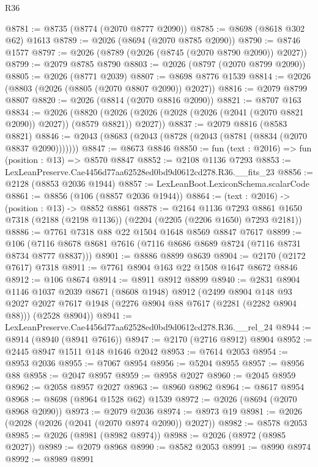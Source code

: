 \begin{lexlean}{R36}
\begin{coremodule}
@8781 := @8735 (@8774 (@2070 @8777 @2090))
@8785 := @8698 (@8618 @302 @62) @1613
@8789 := @2026 (@8694 (@2070 @8785 @2090))
@8790 := @8746 @1577
@8797 := @2026 (@8789 (@2026 (@8745 (@2070 @8790 @2090)) @2027))
@8799 := @2079 @8785 @8790
@8803 := @2026 (@8797 (@2070 @8799 @2090))
@8805 := @2026 (@8771 @2039)
@8807 := @8698 @8776 @1539
@8814 := @2026 (@8803 (@2026 (@8805 (@2070 @8807 @2090)) @2027))
@8816 := @2079 @8799 @8807
@8820 := @2026 (@8814 (@2070 @8816 @2090))
@8821 := @8707 @163
@8834 := @2026
    (@8820 (@2026 (@2026 (@2028 (@2026 (@2041 (@2070 @8821 @2090)) @2027)) (@8579 @8821)) @2027))
@8837 := @2079 @8816 (@8583 @8821)
@8846 := @2043 (@8683 (@2043 (@8728 (@2043 (@8781 (@8834 (@2070 @8837 @2090)))))))
@8847 := @8673 @8846
@8850 := fun (text : @2016) => fun (position : @13) => @8570 @8847
@8852 := @2108 @1136 @7293
@8853 := LexLeanPreserve.Cae4456d77aa62528ed0bd9d0612cd278.R36.__fits_23
@8856 := @2128 (@8853 @2036 @1944)
@8857 := LexLeanBoot.LexiconSchema.scalarCode
@8861 := @8856 (@106 (@8857 @2036 @1944))
@8864 := (text : @2016) -> (position : @13) -> @8852 @8861
@8878 := @2164
    @1136
    @7293
    @8861
    @1650
    @7318
    (@2188 (@2198 @1136))
    (@2204 (@2205 (@2206 @1650) @7293 @2181))
@8886 := @7761 @7318 @88 @22 @1504 @1648 @8569 @8847 @7617
@8899 := @106 (@7116 @8678 @8681 @7616 (@7116 @8686 @8689 @8724 (@7116 @8731 @8734 @8777 @8837)))
@8901 := @8886 @8899 @8639
@8904 := @2170 (@2172 @7617) @7318
@8911 := @7761 @8904 @163 @22 @1508 @1647 @8672 @8846
@8912 := @106 @8674
@8914 := @8911 @8912 @8899
@8940 := @2831
    @8904
    @1146
    @1037
    @2039
    @8671
    (@8608 @1948)
    @8912
    (@2499
      @8904
      @148
      @93
      @2027
      @2027
      @7617
      @1948
      (@2276 @8904 @88 @7617 (@2281 (@2282 @8904 @88)))
      (@2528 @8904))
@8941 := LexLeanPreserve.Cae4456d77aa62528ed0bd9d0612cd278.R36.__rel_24
@8944 := @8914 (@8940 (@8941 @7616))
@8947 := @2170 (@2716 @8912) @8904
@8952 := @2445 @8947 @1511 @148 @1646 @2042
@8953 := @7614 @2053
@8954 := @8953 @2036
@8955 := @7067 @8954
@8956 := @5204 @8955
@8957 := @8956 @88
@8958 := @2047 @8957
@8959 := @8958 @2027
@8960 := @2045 @8959
@8962 := @2058 @8957 @2027
@8963 := @8960 @8962
@8964 := @8617 @8954
@8968 := @8698 (@8964 @1528 @62) @1539
@8972 := @2026 (@8694 (@2070 @8968 @2090))
@8973 := @2079 @2036
@8974 := @8973 @19
@8981 := @2026 (@2028 (@2026 (@2041 (@2070 @8974 @2090)) @2027))
@8982 := @8578 @2053
@8985 := @2026 (@8981 (@8982 @8974))
@8988 := @2026 (@8972 (@8985 @2027))
@8989 := @2079 @8968
@8990 := @8582 @2053
@8991 := @8990 @8974
@8992 := @8989 @8991

\end{coremodule}
\end{lexlean}
